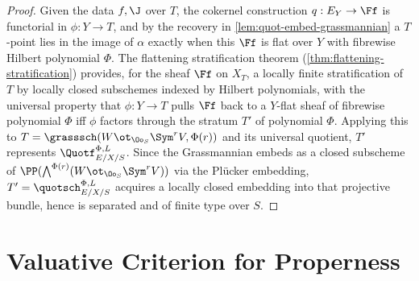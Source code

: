 \begin{proof}
  Given the data $f, \J$ over $T$, the cokernel construction $q : E_Y \to \Ff$
  is functorial in $\phi : Y \to T$, and by the recovery in
  \cref{lem:quot-embed-grassmannian} a $T$-point lies in the image of $\alpha$
  exactly when this $\Ff$ is flat over $Y$ with fibrewise Hilbert polynomial
  $\Phi$. The flattening stratification theorem
  (\cref{thm:flattening-stratification}) provides, for the sheaf $\Ff$ on $X_T$,
  a locally finite stratification of $T$ by locally closed subschemes indexed by
  Hilbert polynomials, with the universal property that $\phi : Y \to T$
  pulls $\Ff$ back to a $Y$-flat sheaf of fibrewise polynomial $\Phi$ iff $\phi$
  factors through the stratum $T'$ of polynomial $\Phi$. Applying this to
  $T = \grasssch(W \ot_{\Oo_S}\Sym^r V, \Phi(r))$ and its universal quotient,
  $T'$ represents $\Quotf_{E/X/S}^{\Phi,L}$. Since the Grassmannian embeds as a
  closed subscheme of $\PP(\bigwedge^{\Phi(r)}(W \ot_{\Oo_S}\Sym^r V))$ via the
  Plücker embedding, $T' = \quotsch_{E/X/S}^{\Phi,L}$ acquires a locally closed
  embedding into that projective bundle, hence is separated and of finite type
  over $S$.
\end{proof}

\bigskip
\section*{Valuative Criterion for Properness}
\medskip

